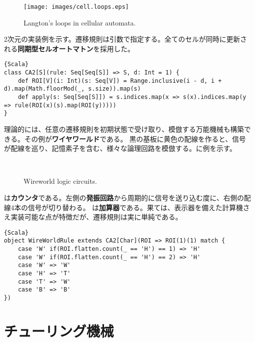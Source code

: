 \documentclass[10pt,a4paper]{book}
\begin{document}
\begin{figure}[h]
\centering
\texttt{[image: images/cell.loops.eps]}
\caption{Langton's loops in cellular automata.\label{fig:langton}}
\end{figure}

2次元の実装例を示す。遷移規則は引数で指定する。全てのセルが同時に更新される\textbf{同期型セルオートマトン}を採用した。

\begin{Verbatim}{Scala}
class CA2[S](rule: Seq[Seq[S]] => S, d: Int = 1) {
	def ROI[V](i: Int)(s: Seq[V]) = Range.inclusive(i - d, i + d).map(Math.floorMod(_, s.size)).map(s)
	def apply(s: Seq[Seq[S]]) = s.indices.map(x => s(x).indices.map(y => rule(ROI(x)(s).map(ROI(y)))))
}
\end{Verbatim}

理論的には、任意の遷移規則を初期状態で受け取り、模倣する万能機械も構築できる。その例が\textbf{ワイヤワールド}である。
黒の基板に黄色の配線を作ると、信号が配線を巡り、記憶素子を含む、様々な論理回路を模倣する。に例を示す。

\begin{figure}[h]
\centering
{}\\
\caption{Wireworld logic circuits.\label{fig:wire}}
\end{figure}

は\textbf{カウンタ}である。左側の\textbf{発振回路}から周期的に信号を送り込む度に、右側の配線4本の信号が切り替わる。
は\textbf{加算器}である。果ては、表示器を備えた計算機さえ実装可能な点が特徴だが、遷移規則は実に単純である。

\begin{Verbatim}{Scala}
object WireWorldRule extends CA2[Char](ROI => ROI(1)(1) match {
	case 'W' if(ROI.flatten.count(_ == 'H') == 1) => 'H'
	case 'W' if(ROI.flatten.count(_ == 'H') == 2) => 'H'
	case 'W' => 'W'
	case 'H' => 'T'
	case 'T' => 'W'
	case 'B' => 'B'
})
\end{Verbatim}

\section{チューリング機械\label{sect:turing}}
\end{document}
